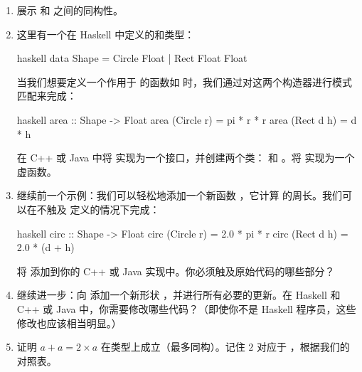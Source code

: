 \begin{enumerate}
  \tightlist
  \item
  展示  和  之间的同构性。
  \item
  这里有一个在 Haskell 中定义的和类型：

  \begin{snip}{haskell}
    data Shape = Circle Float
    | Rect Float Float
  \end{snip}
  当我们想要定义一个作用于  的函数如  时，我们通过对这两个构造器进行模式匹配来完成：

  \begin{snip}{haskell}
    area :: Shape -> Float
    area (Circle r) = pi * r * r
    area (Rect d h) = d * h
  \end{snip}
  在 C++ 或 Java 中将  实现为一个接口，并创建两个类： 和 。将  实现为一个虚函数。
  \item
  继续前一个示例：我们可以轻松地添加一个新函数 ，它计算  的周长。我们可以在不触及  定义的情况下完成：

  \begin{snip}{haskell}
    circ :: Shape -> Float
    circ (Circle r) = 2.0 * pi * r
    circ (Rect d h) = 2.0 * (d + h)
  \end{snip}
  将  添加到你的 C++ 或 Java 实现中。你必须触及原始代码的哪些部分？
  \item
  继续进一步：向  添加一个新形状 ，并进行所有必要的更新。在 Haskell 和 C++ 或 Java 中，你需要修改哪些代码？（即使你不是 Haskell 程序员，这些修改也应该相当明显。）
  \item
  证明 $a + a = 2 \times a$ 在类型上成立（最多同构）。记住 $2$ 对应于 ，根据我们的对照表。
\end{enumerate}
